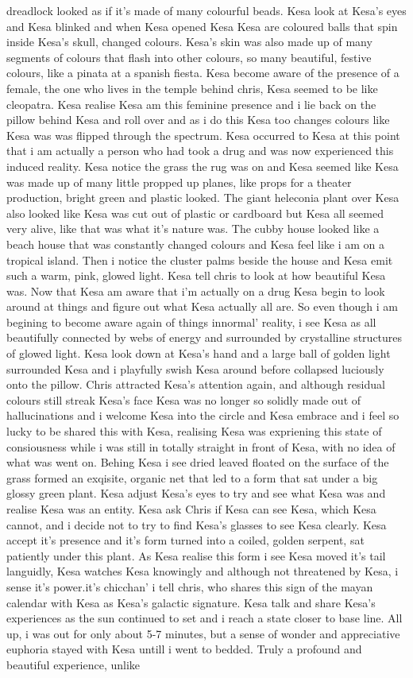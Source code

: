 \documentclass[12pt]{book}
\begin{document}
dreadlock looked as if it's made of many colourful beads. Kesa look at Kesa's eyes and Kesa blinked and when Kesa opened Kesa Kesa are coloured balls that spin inside Kesa's skull, changed colours. Kesa's skin was also made up of many segments of colours that flash into other colours, so many beautiful, festive colours, like a pinata at a spanish fiesta. Kesa become aware of the presence of a female, the one who lives in the temple behind chris, Kesa seemed to be like cleopatra. Kesa realise Kesa am this feminine presence and i lie back on the pillow behind Kesa and roll over and as i do this Kesa too changes colours like Kesa was was flipped through the spectrum. Kesa occurred to Kesa at this point that i am actually a person who had took a drug and was now experienced this induced reality. Kesa notice the grass the rug was on and Kesa seemed like Kesa was made up of many little propped up planes, like props for a theater production, bright green and plastic looked. The giant heleconia plant over Kesa also looked like Kesa was cut out of plastic or cardboard but Kesa all seemed very alive, like that was what it's nature was. The cubby house looked like a beach house that was constantly changed colours and Kesa feel like i am on a tropical island. Then i notice the cluster palms beside the house and Kesa emit such a warm, pink, glowed light. Kesa tell chris to look at how beautiful Kesa was. Now that Kesa am aware that i'm actually on a drug Kesa begin to look around at things and figure out what Kesa actually all are. So even though i am begining to become aware again of things innormal' reality, i see Kesa as all beautifully connected by webs of energy and surrounded by crystalline structures of glowed light. Kesa look down at Kesa's hand and a large ball of golden light surrounded Kesa and i playfully swish Kesa around before collapsed luciously onto the pillow. Chris attracted Kesa's attention again, and although residual colours still streak Kesa's face Kesa was no longer so solidly made out of hallucinations and i welcome Kesa into the circle and Kesa embrace and i feel so lucky to be shared this with Kesa, realising Kesa was expriening this state of consiousness while i was still in totally straight in front of Kesa, with no idea of what was went on. Behing Kesa i see dried leaved floated on the surface of the grass formed an exqisite, organic net that led to a form that sat under a big glossy green plant. Kesa adjust Kesa's eyes to try and see what Kesa was and realise Kesa was an entity. Kesa ask Chris if Kesa can see Kesa, which Kesa cannot, and i decide not to try to find Kesa's glasses to see Kesa clearly. Kesa accept it's presence and it's form turned into a coiled, golden serpent, sat patiently under this plant. As Kesa realise this form i see Kesa moved it's tail languidly, Kesa watches Kesa knowingly and although not threatened by Kesa, i sense it's power.it's chicchan' i tell chris, who shares this sign of the mayan calendar with Kesa as Kesa's galactic signature. Kesa talk and share Kesa's experiences as the sun continued to set and i reach a state closer to base line. All up, i was out for only about 5-7 minutes, but a sense of wonder and appreciative euphoria stayed with Kesa untill i went to bedded. Truly a profound and beautiful experience, unlike 
\end{document}
